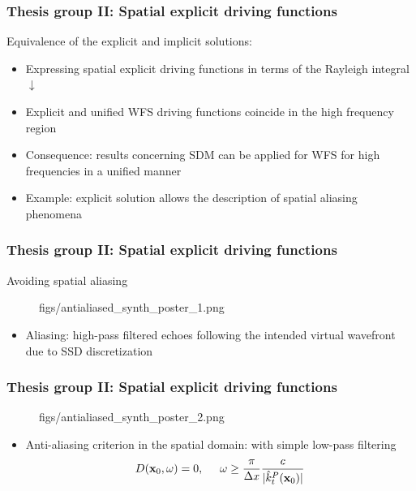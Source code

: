 \documentclass{beamer}
\begin{document}
\begin{frame}
\frametitle{Thesis group II: Spatial explicit driving functions}
Equivalence of the explicit and implicit solutions:
\begin{itemize}
\item Expressing spatial explicit driving functions in terms of the Rayleigh integral
\\ \hspace{4.5cm} $\downarrow$ \hspace{2cm} \\
\item Explicit and unified WFS driving functions coincide in the high frequency region
\item Consequence: {\color{blue} results concerning SDM can be applied for WFS for high frequencies in a unified manner}
\item Example: explicit solution allows the description of spatial aliasing phenomena
\end{itemize}
\end{frame}

\begin{frame}
\frametitle{Thesis group II: Spatial explicit driving functions}
Avoiding spatial aliasing
	\vspace{-3.5mm}	
	\begin{figure}
	\centering
	\begin{overpic}[width = 0.65\columnwidth ]{figs/antialiased_synth_poster_1.png}
	\end{overpic}
	\end{figure} 
	\vspace{-7mm}
		\begin{itemize}
		\item Aliasing: high-pass filtered echoes following the intended virtual wavefront due to SSD discretization
		\end{itemize}
\end{frame}

\begin{frame}
\frametitle{Thesis group II: Spatial explicit driving functions}
	\begin{figure}
	\centering
	\begin{overpic}[width = 0.65\columnwidth ]{figs/antialiased_synth_poster_2.png}
	\end{overpic}
	\end{figure} 
	\vspace{-7mm}
		\begin{itemize}
		\item Anti-aliasing criterion in the spatial domain: with simple low-pass filtering 
		\begin{equation*}
		D(\mathbf{x}_0,\omega) = 0, \hspace{5mm} \omega \geq \frac{\pi}{\Delta x} \frac{c}{| \hat{k}^P_t(\mathbf{x}_0) |}
		\end{equation*}
		\end{itemize}
\end{frame}  
\end{document}
